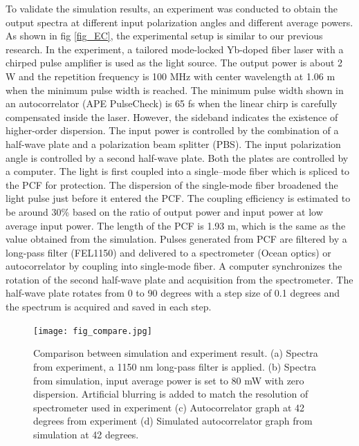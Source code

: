 \documentclass{osa-article}
\begin{document}
To validate the simulation results, an experiment was conducted to obtain the output spectra at different input polarization angles and different average powers. As shown in fig \ref{fig_EC}, the experimental setup is similar to our previous research\cite{chen_dual-soliton_2016}. In the experiment, a tailored mode-locked Yb-doped fiber laser with a chirped pulse amplifier is used as the light source. The output power is about 2 W and the repetition frequency is 100 MHz with center wavelength at 1.06 \textmu m when the minimum pulse width is reached. The minimum pulse width shown in an autocorrelator (APE PulseCheck) is 65 fs when the linear chirp is carefully compensated inside the laser. However, the sideband indicates the existence of higher-order dispersion. The input power is controlled by the combination of a half-wave plate and a polarization beam splitter (PBS). The input polarization angle is controlled by a second half-wave plate. Both the plates are controlled by a computer. The light is first coupled into a single–mode fiber which is spliced to the PCF for protection. The dispersion of the single-mode fiber broadened the light pulse just before it entered the PCF. The coupling efficiency is estimated to be around 30\% based on the ratio of output power and input power at low average input power. The length of the PCF is 1.93 m, which is the same as the value obtained from the simulation. Pulses generated from PCF are filtered by a long-pass filter (FEL1150) and delivered to a spectrometer (Ocean optics) or autocorrelator by coupling into single-mode fiber. A computer synchronizes the rotation of the second half-wave plate and acquisition from the spectrometer. The half-wave plate rotates from 0 to 90 degrees with a step size of 0.1 degrees and the spectrum is acquired and saved in each step.

\begin{figure}[htbp]
\centering%
\texttt{[image: fig\_compare.jpg]}
\caption{Comparison between simulation and experiment result. (a) Spectra from experiment, a 1150 nm long-pass filter is applied. (b) Spectra from simulation, input average power is set to 80 mW with zero dispersion. Artificial blurring is added to match the resolution of spectrometer used in experiment (c) Autocorrelator graph at 42 degrees from experiment (d) Simulated autocorrelator graph from simulation at 42 degrees.}
\label{fig_cmp}\vspace*{-6pt}
\end{figure}
\end{document}
